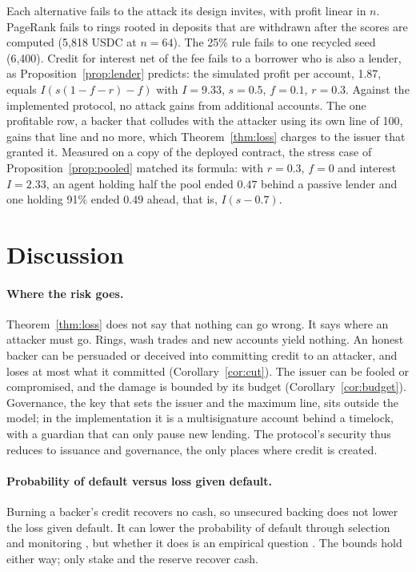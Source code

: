 \documentclass[acmsmall,nonacm,screen]{acmart}
\theoremstyle{acmdefinition}%
\begin{document}
Each alternative fails to the attack its design invites, with profit linear in $n$. PageRank fails
to rings rooted in deposits that are withdrawn after the scores are computed (5{,}818 USDC at
$n=64$). The 25\% rule fails to one recycled seed (6{,}400). Credit for interest net of the fee fails
to a borrower who is also a lender, as Proposition~\ref{prop:lender} predicts: the simulated profit
per account, 1.87, equals $I(s(1-f-r)-f)$ with $I=9.33$, $s=0.5$, $f=0.1$, $r=0.3$. Against the
implemented protocol, no attack gains from additional accounts. The one profitable row, a backer
that colludes with the attacker using its own line of 100, gains that line and no more, which
Theorem~\ref{thm:loss} charges to the issuer that granted it. Measured on a copy of the deployed
contract, the stress case of Proposition~\ref{prop:pooled} matched its formula: with $r=0.3$, $f=0$
and interest $I=2.33$, an agent holding half the pool ended $0.47$ behind a passive lender and one
holding 91\% ended $0.49$ ahead, that is, $I(s-0.7)$.

\section{Discussion}\label{sec:discussion}

\paragraph{Where the risk goes.} Theorem~\ref{thm:loss} does not say that nothing can go wrong. It
says where an attacker must go. Rings, wash trades and new accounts yield nothing. An honest backer
can be persuaded or deceived into committing credit to an attacker, and loses at most what it
committed (Corollary~\ref{cor:cut}). The issuer can be fooled or compromised, and the damage is
bounded by its budget (Corollary~\ref{cor:budget}). Governance, the key that sets the issuer and the
maximum line, sits outside the model; in the implementation it is a multisignature account behind a
timelock, with a guardian that can only pause new lending. The protocol's security thus reduces to
issuance and governance, the only places where credit is created.

\paragraph{Probability of default versus loss given default.} Burning a backer's credit recovers no
cash, so unsecured backing does not lower the loss given default. It can lower the probability of
default through selection and monitoring \citep{stiglitz1990peer,ghatak1999joint}, but whether it
does is an empirical question \citep{gine2014group}. The bounds hold either way; only stake and the
reserve recover cash.
\end{document}
